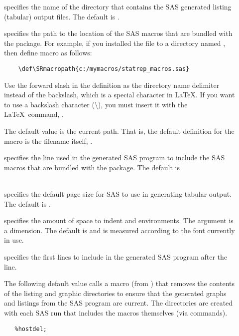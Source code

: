 \documentclass[article,oneside]{memoir}
\begin{document}
\begin{description}
     \item[] specifies the name of the directory that contains the SAS
     generated listing (tabular) output files. The default is .

     \item[] specifies the path to the location of the
     SAS macros that are bundled with the  package.
     For example, if  you installed the  file to a directory named
    ,
    then define macro  as follows:
    \begin{verbatim}
    \def\SRmacropath{c:/mymacros/statrep_macros.sas}
    \end{verbatim}

   Use the forward slash in the definition
   as the directory name delimiter instead of the backslash, which is a special
   character in \LaTeX. If you want to use a backslash character (\textbackslash), you
   must insert it with the \LaTeX\ command, .

   The default value is the current path. That is, the default
   definition for the  macro is the filename itself, .

     \item[] specifies the line used in the generated SAS program to
     include the SAS macros that are bundled with the  package.
     The default is\\~

    \item[] specifies the default page size for SAS to use in generating
    tabular output. The default is .


     \item[] specifies the amount of space to indent
      and  environments.
     The argument is a dimension.
     The default is \Code{3em} and is measured according to the font currently in use.

     \item[] specifies the first lines to include in the generated SAS program
     after the  line.

     The following default value calls a macro (from )
     that removes the contents of the listing and graphic directories to ensure
     that the generated graphs and listings from the SAS program are current.
     The directories are created with
     each SAS run that includes the macros themselves (via  commands).
\begin{snugshade}
\begin{verbatim}
   %hostdel;
\end{verbatim}
\end{snugshade}


\end{description}
\end{document}

